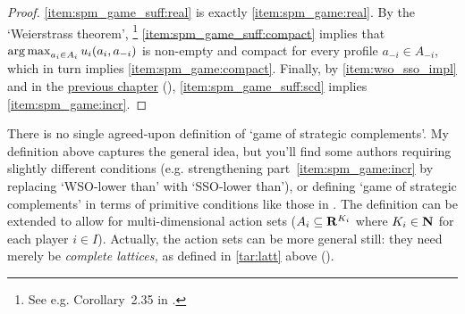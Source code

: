 \begin{proof}
	\ref{item:spm_game_suff:real} is exactly \ref{item:spm_game:real}. By the `Weierstrass theorem',%
		\footnote{See e.g. Corollary~2.35 in \textcite[][p.~40]{AliprantisBorder2006}.}
	\ref{item:spm_game_suff:compact} implies that $\operatorname*{arg\,max}_{a_i \in A_i} u_i(a_i,a_{-i})$ is non-empty and compact for every profile $a_{-i} \in A_{-i}$, which in turn implies \ref{item:spm_game:compact}. Finally, by \ref{item:wso_sso_impl} and  in the \hyperref[ch_mcs]{previous chapter} (), \ref{item:spm_game_suff:scd} implies \ref{item:spm_game:incr}.
\end{proof}

\begin{remark}
	\label{remark:spm_game_defn}
	There is no single agreed-upon definition of `game of strategic complements'. My definition above captures the general idea, but you'll find some authors requiring slightly different conditions (e.g. strengthening part~\ref{item:spm_game:incr} by replacing `WSO-lower than' with `SSO-lower than'), or defining `game of strategic complements' in terms of primitive conditions like those in .
	The definition can be extended to allow for multi-dimensional action sets ($A_i \subseteq \mathbf{R}^{K_i}$ where $K_i \in \mathbf{N}$ for each player $i \in I$). Actually, the action sets can be more general still: they need merely be \emph{complete lattices,} as defined in \cref{tar:latt} above ().
\end{remark}


